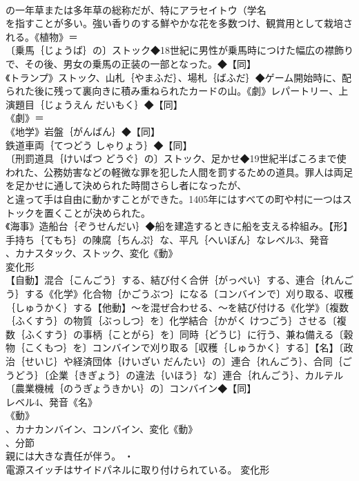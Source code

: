 \documentclass[8pt]{extreport}
\begin{document}
\begin{CJK}{UTF8}{min}
\\	の一年草または多年草の総称だが、特にアラセイトウ（学名
\\	を指すことが多い。強い香りのする鮮やかな花を多数つけ、観賞用として栽培される。《植物》＝
\\	〔乗馬｛じょうば｝の〕ストック◆18世紀に男性が乗馬時につけた幅広の襟飾りで、その後、男女の乗馬の正装の一部となった。◆【同】
\\	《トランプ》ストック、山札｛やまふだ｝、場札｛ばふだ｝◆ゲーム開始時に、配られた後に残って裏向きに積み重ねられたカードの山。《劇》レパートリー、上演題目｛じょうえん だいもく｝◆【同】
\\	《劇》＝
\\	《地学》岩盤｛がんばん｝◆【同】
\\	鉄道車両｛てつどう しゃりょう｝◆【同】
\\	〔刑罰道具｛けいばつ どうぐ｝の〕ストック、足かせ◆19世紀半ばころまで使われた、公務妨害などの軽微な罪を犯した人間を罰するための道具。罪人は両足を足かせに通して決められた時間さらし者になったが、
\\	と違って手は自由に動かすことができた。1405年にはすべての町や村に一つはストックを置くことが決められた。
\\	《海事》造船台｛ぞうせんだい｝◆船を建造するときに船を支える枠組み。【形】手持ち｛てもち｝の陳腐｛ちんぷ｝な、平凡｛へいぼん｝なレベル3、発音
\\	、カナスタック、ストック、変化《動》
\\	変化形 
\\	【自動】混合｛こんごう｝する、結び付く合併｛がっぺい｝する、連合｛れんごう｝する《化学》化合物｛かごうぶつ｝になる〔コンバインで〕刈り取る、収穫｛しゅうかく｝する【他動】～を混ぜ合わせる、～を結び付ける《化学》〔複数｛ふくすう｝の物質｛ぶっしつ｝を〕化学結合｛かがく けつごう｝させる〔複数｛ふくすう｝の事柄｛ことがら｝を〕同時｛どうじ｝に行う、兼ね備える〔穀物｛こくもつ｝を〕コンバインで刈り取る［収穫｛しゅうかく｝する］【名】〔政治｛せいじ｝や経済団体｛けいざい だんたい｝の〕連合｛れんごう｝、合同｛ごうどう｝〔企業｛きぎょう｝の違法｛いほう｝な〕連合｛れんごう｝、カルテル〔農業機械｛のうぎょうきかい｝の〕コンバイン◆【同】
\\	レベル4、発音《名》
\\	《動》
\\	、カナカンバイン、コンバイン、変化《動》
\\	、分節
\\	親には大きな責任が伴う。 ・
\\	電源スイッチはサイドパネルに取り付けられている。	変化形 

\end{CJK}
\end{document}
